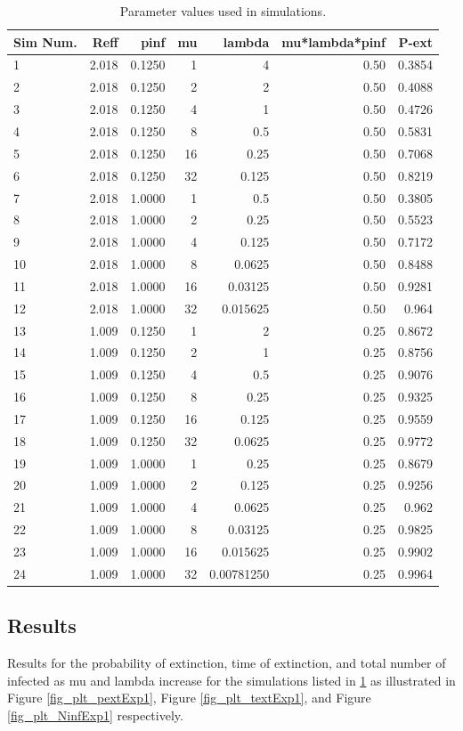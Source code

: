 \documentclass[sr]{drdc-report}
\begin{document}
\begin{table}
\centering
\caption{Parameter values used in simulations.}\label{table_simIparams}
\begin{tabular}{lrrrrrr}
Sim Num. &	Reff	&pinf&	mu&	lambda& mu*lambda*pinf	 & P-ext\\
\hline
1&	2.018&	0.1250&	1&	4	&0.50&0.3854\\
2	&2.018&	0.1250&	2&	2	&0.50&0.4088\\
3&	2.018&	0.1250&	4&	1	&0.50&0.4726\\
4&	2.018&	0.1250&	8&	0.5	&0.50&0.5831\\
5&	2.018&	0.1250&	16&	0.25&	0.50&0.7068\\
6&	2.018&	0.1250&	32	&0.125&	0.50&0.8219\\
7&	2.018&	1.0000&	1&	0.5	&0.50&0.3805\\
8&	2.018&	1.0000	&2&	0.25&	0.50&0.5523\\
9&	2.018&	1.0000	&4	&0.125&	0.50&0.7172\\
10&	2.018&	1.0000	&8	&0.0625	&0.50&0.8488\\
11&	2.018&	1.0000	&16	&0.03125&	0.50&0.9281\\
12&	2.018&	1.0000	&32	&0.015625&	0.50&0.964\\
\hline
13&	1.009&	0.1250&	1&	2&	0.25& 0.8672 \\
14&	1.009&	0.1250&	2&	1&	0.25&0.8756\\
15&	1.009&	0.1250&	4&	0.5&	0.25&0.9076\\
16&	1.009&	0.1250&	8&	0.25&	0.25&0.9325\\
17&	1.009&	0.1250&	16&	0.125&	0.25&0.9559 \\
18&	1.009&	0.1250&	32&	0.0625&	0.25&0.9772\\
19&	1.009&	1.0000&	1&	0.25&	0.25&0.8679\\
20&	1.009&	1.0000&	2&	0.125&	0.25&0.9256\\
21&	1.009&	1.0000&	4&	0.0625&	0.25&0.962\\
22&	1.009&	1.0000&	8&	0.03125&	0.25&0.9825\\
23&	1.009&	1.0000&	16&	0.015625&	0.25&0.9902\\
24&	1.009&	1.0000&	32	&0.00781250&	0.25&0.9964\\
\hline
\end{tabular}
\end{table}


\subsection{Results}
Results for the probability of extinction, time of extinction, and total number of infected as mu and lambda increase for the simulations listed in \ref{table_simIparams} as illustrated in Figure \ref{fig_plt_pextExp1}, Figure \ref{fig_plt_textExp1}, and Figure \ref{fig_plt_NinfExp1} respectively.
\end{document}

